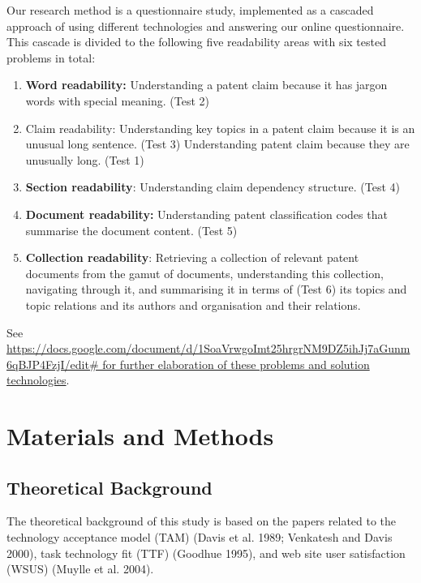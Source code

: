 \documentclass[11pt]{article}
\begin{document}
Our research method is a questionnaire study, implemented as a cascaded approach of using different technologies and answering our online questionnaire. This cascade is divided to the following five readability areas with six tested problems in total:

\begin{enumerate}
\item \textbf{Word readability:} Understanding a patent claim because it has jargon words with special meaning. (Test 2)
\item Claim readability: 
Understanding key topics in a patent claim because it is an unusual long sentence. (Test 3)
Understanding patent claim because they are unusually long. (Test 1)
\item \textbf{Section readability}: Understanding claim dependency structure. (Test 4)
\item \textbf{Document readability:} Understanding patent classification codes that summarise the document content. (Test 5)
\item \textbf{Collection readability}: Retrieving a collection of relevant patent documents from the gamut of documents, understanding this collection, navigating through it, and summarising it in terms of  (Test 6) its topics and topic relations and its authors and organisation and their relations.  
\end{enumerate} 

See \url{https://docs.google.com/document/d/1SoaVrwgoImt25hrgrNM9DZ5ihJj7aGunm6qBJP4FzjI/edit#  for further elaboration of these problems and solution technologies}.

 
 
\section{Materials and Methods}
\label{material}

\subsection{Theoretical Background}

The theoretical background of this study is based on the papers related to the technology acceptance model (TAM) (Davis et al. 1989; Venkatesh and Davis 2000), task technology fit (TTF) (Goodhue 1995), and web site user satisfaction (WSUS) (Muylle et al. 2004).
\end{document}
